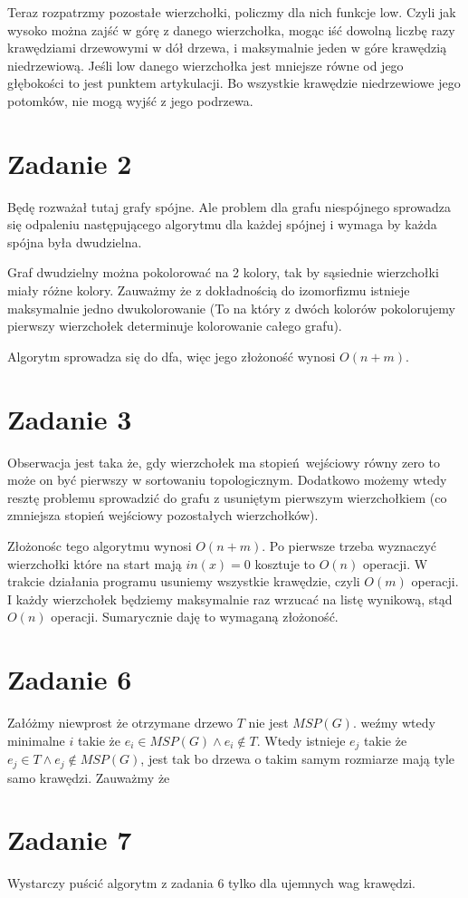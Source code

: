 \documentclass{article}
\begin{document}
Teraz rozpatrzmy pozostałe wierzchołki, policzmy dla nich funkcje low. Czyli jak wysoko można zajść w górę z danego wierzchołka,
mogąc iść dowolną liczbę razy krawędziami drzewowymi w dół drzewa, i maksymalnie jeden w góre krawędzią niedrzewiową.
Jeśli low danego wierzchołka jest mniejsze równe od jego głębokości to jest punktem artykulacji. 
Bo wszystkie krawędzie niedrzewiowe jego potomków, nie mogą wyjść z jego podrzewa.

\section*{Zadanie 2}
Będę rozważał tutaj grafy spójne. Ale problem dla grafu niespójnego sprowadza się odpaleniu następującego algorytmu dla każdej spójnej i wymaga by każda spójna była dwudzielna.

Graf dwudzielny można pokolorować na 2 kolory, tak by sąsiednie wierzchołki miały różne kolory. Zauważmy że z dokładnością do izomorfizmu istnieje maksymalnie jedno dwukolorowanie (To na który z dwóch kolorów pokolorujemy pierwszy wierzchołek determinuje kolorowanie całego grafu). 



Algorytm sprowadza się do dfa, więc jego złożoność wynosi $O(n+m)$.

\section*{Zadanie 3} 

Obserwacja jest taka że, gdy wierzchołek ma stopień wejściowy równy zero to może 
on być pierwszy w sortowaniu topologicznym. Dodatkowo możemy wtedy resztę problemu sprowadzić do grafu z usuniętym pierwszym wierzchołkiem (co zmniejsza stopień wejściowy pozostałych wierzchołków).

Złożonośc tego algorytmu wynosi $O(n+m)$. Po pierwsze trzeba wyznaczyć wierzchołki które na start mają $in(x) = 0$ kosztuje to $O(n)$ operacji. W trakcie działania programu usuniemy wszystkie krawędzie, czyli $O(m)$ operacji. I każdy wierzchołek będziemy maksymalnie raz wrzucać na listę wynikową, stąd $O(n)$ operacji. Sumarycznie daję to wymaganą złożoność.


\section*{Zadanie 6}
Załóżmy niewprost że otrzymane drzewo $T$ nie jest $MSP(G)$. weźmy wtedy minimalne $i$ takie że $e_i \in MSP(G) \land e_i \not\in T$. Wtedy istnieje $e_j$ takie że $e_j \in T \land e_j \not\in MSP(G)$, jest tak bo drzewa o takim samym rozmiarze mają tyle samo krawędzi. Zauważmy że 

\section*{Zadanie 7}
Wystarczy puścić algorytm z zadania 6 tylko dla ujemnych wag krawędzi.
\end{document}
